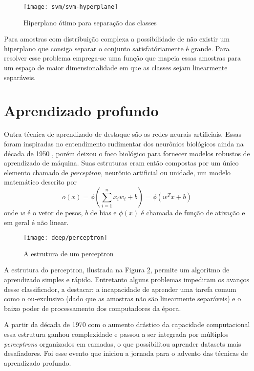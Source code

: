 \begin{figure}
\centering
\texttt{[image: svm/svm-hyperplane]}
\caption{Hiperplano ótimo para separação das classes}
\label{fig:svm-hyperplane}
\end{figure}

Para amostras com distribuição complexa a possibilidade de não existir um hiperplano que consiga separar o conjunto satisfatóriamente é grande. Para resolver esse problema emprega-se uma função que mapeia essas amostras para um espaço de maior dimensionalidade em que as classes sejam linearmente separáveis.

\section{Aprendizado profundo}
\label{introducao:perceptron}
Outra técnica de aprendizado de destaque são as redes neurais artificiais. Essas foram inspiradas no entendimento rudimentar dos neurônios biológicos ainda na década de 1950 \cite{perceptron1957}, porém deixou o foco biológico para fornecer modelos robustos de aprendizado de máquina. Suas estruturas eram então compostas por um único elemento chamado de \textit{perceptron}, neurônio artificial ou unidade, um modelo matemático descrito por
\begin{equation}
\label{eq:perceptron}
o(x) = \phi\left(\sum_{i=1}^n x_i w_i+b\right) = \phi\left(w^T x+b\right)
\end{equation}
onde $w$ é o vetor de pesos, $b$ de bias e $\phi(x)$ é chamada de função de ativação e em geral é não linear. 

\begin{figure}
\centering
\texttt{[image: deep/perceptron]}
\caption{A estrutura de um perceptron}
\label{fig:perceptron}
\end{figure}

A estrutura do perceptron, ilustrada na Figura \ref{fig:perceptron}, permite um algoritmo de aprendizado simples e rápido. Entretanto alguns problemas impediram os avanços desse classificador, a destacar: a incapacidade de aprender uma tarefa comum como o ou-exclusivo (dado que as amostras não são linearmente separáveis) e o baixo poder de processamento dos computadores da época.

A partir da década de 1970 com o aumento drástico da capacidade computacional essa estrutura ganhou complexidade e passou a ser integrada por múltiplos \textit{perceptrons} organizados em camadas, o que possibilitou aprender datasets mais desafiadores. Foi esse evento que iniciou a jornada para o advento das técnicas de aprendizado profundo.

